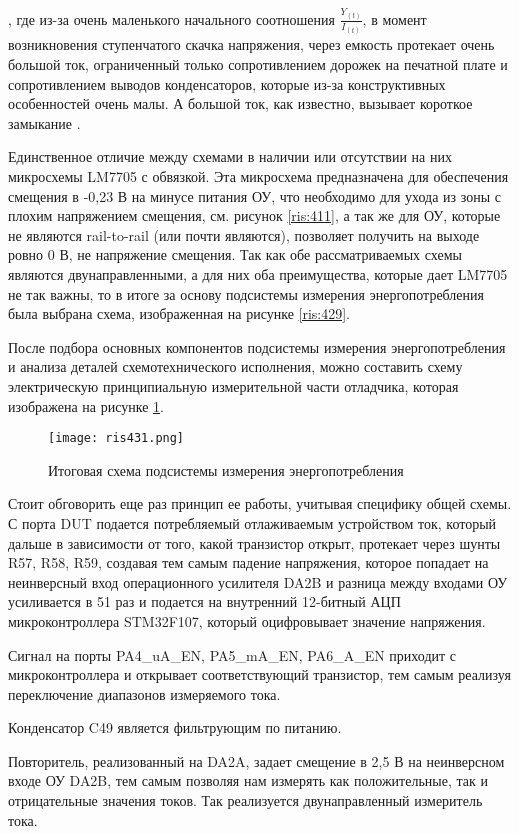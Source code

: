 , где из-за очень маленького начального соотношения $\frac{Y_{(t)}}{I_{(t)}}$, в момент возникновения ступенчатого
скачка напряжения, через емкость протекает очень большой ток, ограниченный только сопротивлением
дорожек на печатной плате и сопротивлением выводов конденсаторов, которые из-за конструктивных особенностей очень
малы. А большой ток, как известно, вызывает короткое замыкание \cite{Howard J: Start Black Magic}.

Единственное отличие между схемами в наличии или отсутствии на них микросхемы LM7705 с обвязкой. Эта микросхема
предназначена для обеспечения смещения в -0,23 В на минусе питания ОУ, что необходимо для ухода из зоны с плохим 
напряжением смещения, см. рисунок \ref{ris:411}, а так же для ОУ, которые не являются 
rail-to-rail (или почти являются), позволяет получить на выходе ровно 0 В, не напряжение смещения. 
Так как обе рассматриваемых схемы являются двунаправленными, а для них оба преимущества, которые дает LM7705 не так 
важны, то в итоге за основу подсистемы измерения энергопотребления была выбрана схема, изображенная на рисунке 
\ref{ris:429}.

После подбора основных компонентов подсистемы измерения энергопотребления и анализа деталей схемотехнического
исполнения, можно составить схему электрическую принципиальную измерительной части отладчика, 
которая изображена на рисунке \ref{ris:431}.

\begin{figure}[H]
\centering
\texttt{[image: ris431.png]}
\caption{Итоговая схема подсистемы измерения энергопотребления}
\label{ris:431}
\end{figure}

Стоит обговорить еще раз принцип ее работы, учитывая специфику общей схемы. 
С порта DUT подается потребляемый отлаживаемым устройством ток, который дальше в зависимости 
от того, какой транзистор открыт, протекает через шунты R57, R58, R59, создавая тем самым падение напряжения, 
которое попадает на неинверсный вход операционного усилителя DA2B и разница между входами ОУ усиливается в 51 
раз и подается на внутренний 12-битный АЦП микроконтроллера STM32F107, который оцифровывает значение  напряжения.

Сигнал на порты PA4\_uA\_EN, PA5\_mA\_EN, PA6\_A\_EN приходит с микроконтроллера и открывает соответствующий 
транзистор, тем самым реализуя переключение диапазонов измеряемого тока.

Конденсатор C49 является фильтрующим по питанию. 

Повторитель, реализованный на DA2A, задает смещение в 2,5 В на неинверсном входе ОУ DA2B, тем самым позволяя нам 
измерять как положительные, так и отрицательные значения токов. Так реализуется двунаправленный измеритель тока. 
